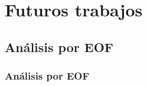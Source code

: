 \documentclass{beamer}
\newtheorem{Th1}{Reseña Historica}
\newtheorem{Th2}{Definición}
\begin{document}
%
%

	\section{Futuros trabajos}
	\subsection{Análisis por EOF}
	\begin{frame}
		\frametitle{Análisis por EOF}
	\end{frame} 
\end{document}
